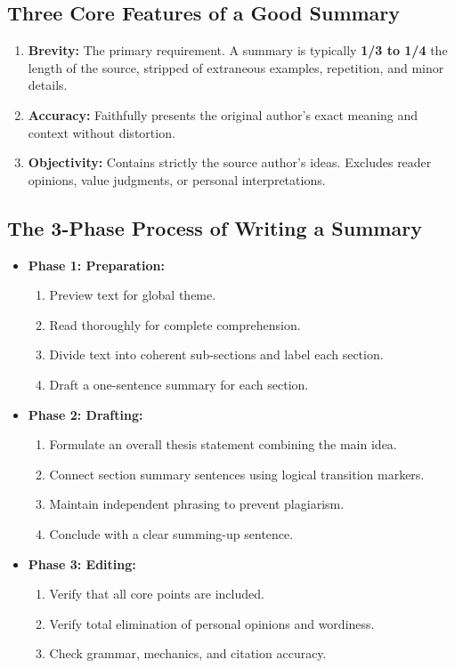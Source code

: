 \documentclass[11pt, a4paper]{article}
\begin{document}
\subsection{Three Core Features of a Good Summary}
\begin{mdframed}[style=summarybox]
    \begin{enumerate}
        \item \textbf{Brevity:} The primary requirement. A summary is typically \textbf{1/3 to 1/4} the length of the source, stripped of extraneous examples, repetition, and minor details.
        \item \textbf{Accuracy:} Faithfully presents the original author's exact meaning and context without distortion.
        \item \textbf{Objectivity:} Contains strictly the source author's ideas. Excludes reader opinions, value judgments, or personal interpretations.
    \end{enumerate}
\end{mdframed}

\subsection{The 3-Phase Process of Writing a Summary}
\begin{itemize}
    \item \textbf{Phase 1: Preparation:}
    \begin{enumerate}[label=\arabic*.]
        \item Preview text for global theme.
        \item Read thoroughly for complete comprehension.
        \item Divide text into coherent sub-sections and label each section.
        \item Draft a one-sentence summary for each section.
    \end{enumerate}
    \item \textbf{Phase 2: Drafting:}
    \begin{enumerate}[label=\arabic*.]
        \item Formulate an overall thesis statement combining the main idea.
        \item Connect section summary sentences using logical transition markers.
        \item Maintain independent phrasing to prevent plagiarism.
        \item Conclude with a clear summing-up sentence.
    \end{enumerate}
    \item \textbf{Phase 3: Editing:}
    \begin{enumerate}[label=\arabic*.]
        \item Verify that all core points are included.
        \item Verify total elimination of personal opinions and wordiness.
        \item Check grammar, mechanics, and citation accuracy.
    \end{enumerate}
\end{itemize}
\end{document}
